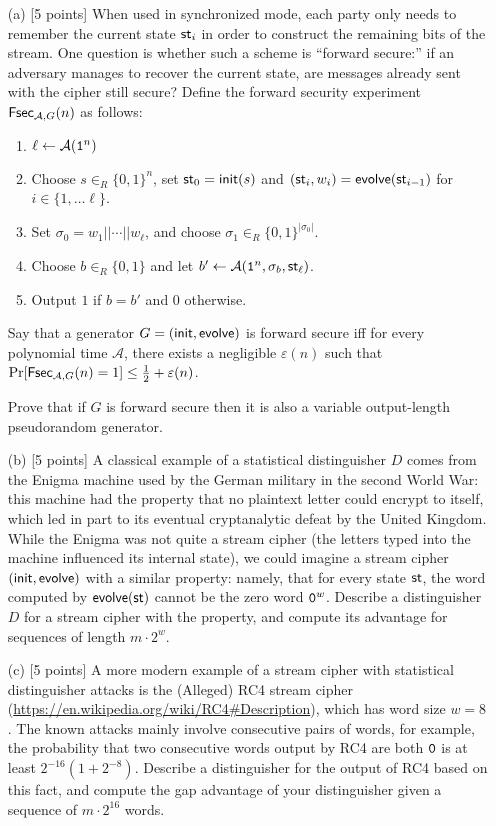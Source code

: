 \documentclass[11pt]{article}
\newcommand{\cA}{\mathcal{A}}
\begin{document}
\begin{itemize}
\item[(a)] [5 points] When used in synchronized mode, each party only needs to remember the
  current state $\textsf{st}_i$ in order to construct the remaining bits of
  the stream. One question is whether such a scheme is ``forward
  secure:'' if an adversary manages to recover the current state, are
  messages already sent with the cipher still secure?  Define the
  forward security experiment $\fsec{\cA,G}(n)$ as follows:
\begin{enumerate}
\item $\ell \gets \cA({\tt 1}^n)$
\item Choose $s \in_R \{0,1\}^n$, set $\textsf{st}_0 = \textsf{init}(s)$ and
  $(\textsf{st}_i,w_i) = \textsf{evolve}(\textsf{st}_{i-1})$ for $i \in \{1,\dots\ell\}$.
\item Set $\sigma_0 = w_1||\cdots||w_\ell$, and choose $\sigma_1 \in_R
  \{0,1\}^{|\sigma_0|}$.
\item Choose $b \in_R \{0,1\}$ and let $b' \gets \cA({\tt 1}^n,
  \sigma_b, \st_\ell)$.
\item Output $1$ if $b=b'$ and $0$ otherwise.
\end{enumerate}
Say that a generator $G = (\textsf{init},\textsf{evolve})$ is forward secure
iff for every polynomial time $\cA$, there exists a negligible
$\varepsilon(n)$ such that $\Pr[\fsec{\cA,G}(n)=1] \leq \frac{1}{2} +
  \varepsilon(n)$. 

Prove that if $G$ is forward secure then it is also a variable
output-length pseudorandom generator.

\item[(b)] [5 points] A classical example of a statistical
  distinguisher $D$ comes from the Enigma machine used by the German
  military in the second World War: this machine had the property that
  no plaintext letter could encrypt to itself, which led in part to
  its eventual cryptanalytic defeat by the United Kingdom.  While the
  Enigma was not quite a stream cipher (the letters typed into the
  machine influenced its internal state), we could imagine a stream
  cipher $(\textsf{init},\textsf{evolve})$ with a similar property: namely,
  that for every state $\textsf{st}$, the word computed by $\textsf{evolve}(\textsf{st})$
  cannot be the zero word ${\tt 0}^w$.  Describe a distinguisher $D$
  for a stream cipher with the property, and compute its advantage for
  sequences of length $m\cdot 2^w$.

\item[(c)] [5 points] A more modern example of a stream cipher with
  statistical distinguisher attacks is the (Alleged) RC4 stream cipher
  (\url{https://en.wikipedia.org/wiki/RC4#Description}), which has
  word size $w=8$.  The known attacks mainly involve consecutive pairs
  of words, for example, the probability that two consecutive words output by
  RC4 are both ${\tt 0}$ is at least $2^{-16}(1+2^{-8})$.  Describe a
  distinguisher for the output of RC4 based on this fact, and compute
  the gap advantage of your distinguisher given a sequence of $m\cdot 2^{16}$ words.
\end{itemize}
\end{document}
